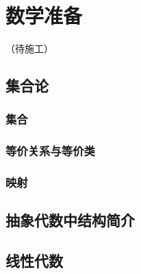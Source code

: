 \chapter{数学准备}

（待施工）

\section{集合论}

\subsection{集合}

\subsection{等价关系与等价类}

\subsection{映射}

\section{抽象代数中结构简介}

\section{线性代数}